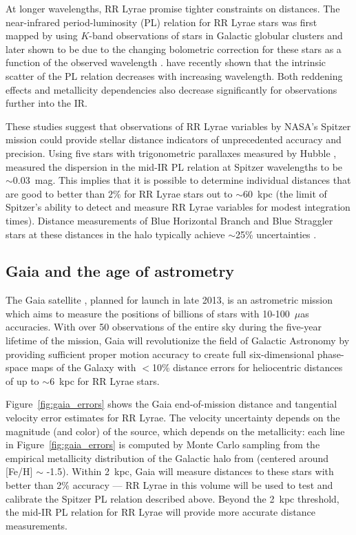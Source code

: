 \documentclass[preprint]{aastex}
\begin{document}
At longer wavelengths, RR Lyrae promise tighter constraints on
distances.  The near-infrared period-luminosity (PL) relation for RR
Lyrae stars was first mapped by \citet{longmore86} using $K$-band
observations of stars in Galactic globular clusters and later shown to
be due to the changing bolometric correction for these stars as a
function of the observed wavelength \citep{catelan04}.
\citet{madore12} have recently shown that the intrinsic scatter of the
PL relation decreases with increasing wavelength. Both reddening
effects and metallicity dependencies also decrease significantly for
observations further into the IR.

These studies suggest that observations of RR Lyrae variables by
NASA's Spitzer mission could provide stellar distance indicators of
unprecedented accuracy and precision.  Using five stars with
trigonometric parallaxes measured by Hubble \citep{benedict11},
\citet{madore12} measured the dispersion in the mid-IR PL relation at
Spitzer wavelengths to be $\sim$0.03~mag. This implies that it is
possible to determine individual distances that are good to better
than $2\%$ for RR Lyrae stars out to $\sim$60~kpc (the limit of
Spitzer's ability to detect and measure RR Lyrae variables for modest
integration times). Distance measurements of Blue Horizontal Branch
and Blue Straggler stars at these distances in the halo typically
achieve $\sim$25\% uncertainties \citep[e.g.,][]{deason12b}.


\subsection{Gaia and the age of astrometry}
\label{sec:gaia}
The Gaia satellite \citep{gaia01}, planned for launch in late 2013, is
an astrometric mission which aims to measure the positions of billions
of stars with 10-100~$\mu$as accuracies. With over 50 observations of
the entire sky during the five-year lifetime of the mission, Gaia will
revolutionize the field of Galactic Astronomy by providing sufficient
proper motion accuracy to create full six-dimensional phase-space maps
of the Galaxy with $<$10\% distance errors for heliocentric distances of
up to $\sim$6~kpc for RR Lyrae stars.

Figure~\ref{fig:gaia_errors} shows the Gaia end-of-mission distance
and tangential velocity error estimates for RR Lyrae. The velocity
uncertainty depends on the magnitude (and color) of the source, which depends on
the metallicity: each line in Figure~\ref{fig:gaia_errors} is computed
by Monte Carlo sampling from the empirical metallicity distribution of
the Galactic halo from \cite{ivezic08} (centered around [Fe/H] $\sim$
-1.5). Within 2~kpc, Gaia will measure distances to these stars with
better than 2\% accuracy --- RR Lyrae in this volume will be used to
test and calibrate the Spitzer PL relation described above. Beyond the
2~kpc threshold, the mid-IR PL relation for RR Lyrae will provide more
accurate distance measurements.
\end{document}
